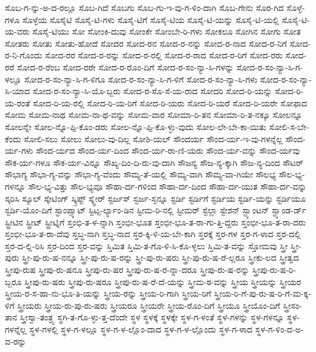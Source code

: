 {ಸೊಬ-ಗ-ನ್ನು-ಅ-ದ-ರಲ್ಲೂ
ಸೊಬ-ಗಿದೆ
ಸೊಬಗು
ಸೊಬ-ಗು-ಇ-ವು-ಗ-ಳಿಂ-ದಾಗಿ
ಸೊಬ-ಗೇನು
ಸೊರ-ಗಿದ
ಸೊಳ್ಳೆ-ಗಳೂ
ಸೊಳ್ಳೆಯ
ಸೊಸೈಟಿ
ಸೊಸೈ-ಟಿ-ಗಳು
ಸೊಸೈ-ಟಿಗೆ
ಸೊಸೈ-ಟಿಯ
ಸೊಸೈ-ಟಿ-ಯನ್ನು
ಸೊಸೈ-ಟಿ-ಯಲ್ಲಿ
ಸೊಸೈ-ಟಿ-ಯ-ವರು
ಸೊಸೈ-ಟಿಯು
ಸೋ
ಸೋಂಕಿ-ದುವು
ಸೋಂಕೇ
ಸೋಂಬೇ-ರಿ-ಗಳು
ಸೋಕಲೂ
ಸೋಗಿನ
ಸೋಗು
ಸೋತ
ಸೋತರು
ಸೋತು
ಸೋತು-ಹೋದೆ
ಸೋದರ
ಸೋದ-ರನ
ಸೋದ-ರ-ನನ್ನು
ಸೋದ-ರ-ನಾದ
ಸೋದ-ರ-ನಿಗೆ
ಸೋದ-ರ-ನಿ-ಗೊಂದು
ಸೋದ-ರರ
ಸೋದ-ರ-ರನ್ನು
ಸೋದ-ರ-ರಲ್ಲಿ
ಸೋದ-ರ-ರಾದ
ಸೋದ-ರ-ರಿಗೆ
ಸೋದ-ರರು
ಸೋದ-ರರೆ
ಸೋದ-ರ-ರೆಂಬ
ಸೋದ-ರರೇ
ಸೋದ-ರ-ರೊಂ-ದಿಗೆ
ಸೋದ-ರ-ಸಂ-ನ್ಯಾ-ಸಿ-ಗಳನ್ನು
ಸೋದ-ರ-ಸಂ-ನ್ಯಾ-ಸಿ-ಗ-ಳಲ್ಲೂ
ಸೋದ-ರ-ಸಂ-ನ್ಯಾ-ಸಿ-ಗ-ಳಿಗೂ
ಸೋದ-ರ-ಸಂ-ನ್ಯಾ-ಸಿ-ಗ-ಳಿಗೆ
ಸೋದ-ರ-ಸಂ-ನ್ಯಾ-ಸಿ-ಗಳು
ಸೋದ-ರ-ಸಂ-ನ್ಯಾ-ಸಿ-ಯಾದ
ಸೋದ-ರ-ಸಂ-ನ್ಯಾ-ಸಿ-ಯೊ-ಬ್ಬರು
ಸೋದ-ರ-ಸೊ-ಸೆ-ಯ-ರಾದ
ಸೋದರಿ
ಸೋದ-ರಿ-ಯನ್ನು
ಸೋದ-ರಿ-ಯ-ರಂತೆ
ಸೋದ-ರಿ-ಯ-ರಲ್ಲಿ
ಸೋದ-ರಿ-ಯ-ರಿಗೆ
ಸೋದ-ರಿ-ಯರು
ಸೋದ-ರಿ-ಯರೆ
ಸೋದ-ರಿ-ಯರೇ
ಸೋಫಾದ
ಸೋಮ
ಸೋಮ-ನಾಥ
ಸೋಮ-ನಾ-ಥ-ವನ್ನು
ಸೋಮ-ವಾರ
ಸೋಮಾ-ರಿ-ತನ
ಸೋಮಾ-ರಿ-ತ-ನಕ್ಕೂ
ಸೋಲನ್ನೂ
ಸೋಲನ್ನೇ
ಸೋಲ-ನ್ನೊ-ಪ್ಪಿ-ಕೊಂ-ಡರು
ಸೋಲ-ನ್ನೊ-ಪ್ಪಿ-ಕೊ-ಳ್ಳು-ವುದು
ಸೋಲ-ಲೇ-ಬೇ-ಕಾ-ಯಿತು
ಸೋಲಿ-ಸ-ಬೇ-ಕೆಂದು
ಸೋಲಿ-ಸಲು
ಸೋಲು
ಸೋಲು-ವು-ದಿಲ್ಲ
ಸೋಶಿ-ಯಲ್
ಸೌಂದರ್ಯ
ಸೌಂದ-ರ್ಯ-ಇ-ವು-ಗಳನ್ನೆಲ್ಲ
ಸೌಂದ-ರ್ಯ-ಗಳು
ಸೌಂದ-ರ್ಯದ
ಸೌಂದ-ರ್ಯ-ದಿಂದ
ಸೌಂದ-ರ್ಯ-ರಾ-ಣಿ-ಯರು
ಸೌಂದ-ರ್ಯ-ವನ್ನು
ಸೌಂದ-ರ್ಯವು
ಸೌಕ-ರ್ಯ-ಗಳೂ
ಸೌಕ-ರ್ಯ-ವಿನ್ನೂ
ಸೌಖ್ಯ-ದಿಂ-ದಿ-ರು-ವು-ದಾಗಿ
ಸೌಜನ್ಯ
ಸೌಜ-ನ್ಯ-ಕ್ಕಾಗಿ
ಸೌಜ-ನ್ಯ-ದಿಂದ
ಸೌಟರ್
ಸೌಭಾಗ್ಯ
ಸೌಭಾ-ಗ್ಯ-ವನ್ನು
ಸೌಭಾ-ಗ್ಯ-ವೆಂದು
ಸೌಮ್ಯ-ತೆ-ಯಲ್ಲಿ
ಸೌಮ್ಯ-ವಾಗಿ
ಸೌಮ್ಯ-ವಾ-ಗಿಯೇ
ಸೌಲಭ್ಯ
ಸೌಲ-ಭ್ಯ-ಗಳನ್ನೂ
ಸೌಲ-ಭ್ಯ-ವಿತ್ತು
ಸೌಲ-ಭ್ಯವೂ
ಸೌಹಾ-ರ್ದ-ಗಳಿಂದ
ಸೌಹಾ-ರ್ದ-ದಿಂದ
ಸೌಹಾ-ರ್ದ-ಯುತ
ಸೌಹಾ-ರ್ದ-ವನ್ನು
ಸ್ಕರಿಸಿ
ಸ್ಕೂಲ್
ಸ್ಕೇಟಿಂಗ್
ಸ್ಕ್ರಿಪ್ಟ್
ಸ್ಕ್ವೇರ್
ಸ್ಟರ್ಜಸ್
ಸ್ಟರ್ಜ-ಸ್ಳನ್ನೂ
ಸ್ಟರ್ಡಿ
ಸ್ಟರ್ಡಿಗೆ
ಸ್ಟರ್ಡಿಯ
ಸ್ಟರ್ಡಿ-ಯನ್ನು
ಸ್ಟರ್ಡಿಯೂ
ಸ್ಟರ್ಡಿ-ಯೊಂ-ದಿಗೆ
ಸ್ಟಾಂಪ್ಸ್ಕಾಟ್
ಸ್ಟಿಟ್ಸ-ರ್ಲ್ಯಾಂ-ಡಿನ
ಸ್ಟೀಮ-ರಿ-ನಲ್ಲಿ
ಸ್ಟೀಮರ್
ಸ್ಟೆಲ್ಲಾ
ಸ್ಟೇಶನ್
ಸ್ಟ್ಯಾಂಟನ್
ಸ್ಟ್ಯಾಂಡ-ರ್ಡ್
ಸ್ಟ್ರೀಟಿನ
ಸ್ಟ್ರೀಟ್
ಸ್ಟ್ರೀಟ್ನಿಗೆ
ಸ್ತಂಭಿ-ತ-ಳ-ನ್ನಾಗಿ
ಸ್ತಂಭೀ-ಭೂತ
ಸ್ತಂಭೀ-ಭೂ-ತ-ರಾ-ಗು-ತ್ತಿ-ದ್ದರು
ಸ್ತಂಭೀ-ಭೂ-ತ-ರಾ-ದರು
ಸ್ತಂಭೀ-ಭೂ-ತ-ರಾ-ದೆವು
ಸ್ತಬ್ಧ-ನಾಗಿ
ಸ್ತಬ್ಧ-ನಾದ
ಸ್ತರ-ಕ್ಕಿ-ಳಿ-ಯ-ಬೇ-ಕಾಗಿ
ಸ್ತರಕ್ಕೆ
ಸ್ತರ-ಗಳ
ಸ್ತರ-ಗ-ಳಾದ
ಸ್ತರ-ದಲ್ಲಿ
ಸ್ತರ-ದ-ಲ್ಲಿ-ರಿಸಿ
ಸ್ತರ-ದಿಂದ
ಸ್ತರ-ವನ್ನು
ಸ್ತಿಮಿತ
ಸ್ತಿಮಿ-ತ-ಗೊ-ಳಿ-ಸಿ-ಕೊ-ಳ್ಳಲು
ಸ್ತಿಮಿ-ತ-ವನ್ನು
ಸ್ತೋಮವು
ಸ್ತ್ರೀ
ಸ್ತ್ರೀ-ಪುರು
ಸ್ತ್ರೀ-ಪು-ರು-ಷ-ನನ್ನೂ
ಸ್ತ್ರೀ-ಪು-ರು-ಷ-ರನ್ನು
ಸ್ತ್ರೀ-ಪು-ರು-ಷರು
ಸ್ತ್ರೀ-ಪು-ರು-ಷ-ರೆ-ಲ್ಲರೂ
ಸ್ತ್ರೀಕು-ಲದ
ಸ್ತ್ರೀತ್ವದ
ಸ್ತ್ರೀಪು-ರುಷ
ಸ್ತ್ರೀಪು-ರು-ಷನೂ
ಸ್ತ್ರೀಪು-ರು-ಷರ
ಸ್ತ್ರೀಪು-ರು-ಷ-ರ-ನ್ನಾ-ದರೂ
ಸ್ತ್ರೀಪು-ರು-ಷ-ರನ್ನು
ಸ್ತ್ರೀಪು-ರು-ಷ-ರಿ-ಬ್ಬರೂ
ಸ್ತ್ರೀಪು-ರು-ಷರು
ಸ್ತ್ರೀಪು-ರು-ಷರೂ
ಸ್ತ್ರೀಪು-ರು-ಷ-ರೆ-ದೆ-ಯನ್ನು
ಸ್ತ್ರೀಮ-ಠ-ವನ್ನು
ಸ್ತ್ರೀಯ
ಸ್ತ್ರೀಯನ್ನು
ಸ್ತ್ರೀಯರ
ಸ್ತ್ರೀಯ-ರ-ಸ-ಹಾ-ನು-ಭೂ-ತಿ-ಯನ್ನು
ಸ್ತ್ರೀಯ-ರನ್ನು
ಸ್ತ್ರೀಯ-ರಿ-ಗಾಗಿ
ಸ್ತ್ರೀಯ-ರಿಗೆ
ಸ್ತ್ರೀಯ-ರಿ-ಗೆ-ಪು-ರು-ಷ-ರಿ-ಗೆ-ಮ-ಕ್ಕ-ಳಿಗೆ
ಸ್ತ್ರೀಯರು
ಸ್ತ್ರೀಯ-ರು-ಪು-ರು-ಷರು
ಸ್ತ್ರೀಯರೂ
ಸ್ತ್ರೀಯರೇ
ಸ್ತ್ರೀಯ-ರೊಂ-ದಿಗೆ
ಸ್ತ್ರೀಯೂ
ಸ್ತ್ರೀಯೊಂ-ದಿಗೆ
ಸ್ತ್ರೀಸಂ-ತಾನ
ಸ್ತ್ರೀಸ್ವಾ-ತಂತ್ರ್ಯ
ಸ್ಥಗಿ-ತ-ಗೊ-ಳ್ಳು-ತ್ತ-ದೆಂದೇ
ಸ್ಥಳ
ಸ್ಥಳಕ್ಕೆ
ಸ್ಥಳಕ್ಕೇ
ಸ್ಥಳ-ಗ-ಳಂತೆ
ಸ್ಥಳ-ಗಳನ್ನು
ಸ್ಥಳ-ಗಳನ್ನೂ
ಸ್ಥಳ-ಗಳನ್ನೆಲ್ಲ
ಸ್ಥಳ-ಗಳಲ್ಲಿ
ಸ್ಥಳ-ಗ-ಳಲ್ಲೂ
ಸ್ಥಳ-ಗ-ಳ-ಲ್ಲೊಂ-ದಾದ
ಸ್ಥಳ-ಗ-ಳ-ಲ್ಲೊಂದು
ಸ್ಥಳ-ಗ-ಳಾದ
ಸ್ಥಳ-ಗ-ಳಿಂ-ದ-ಅ-ವ-ರನ್ನು
}
